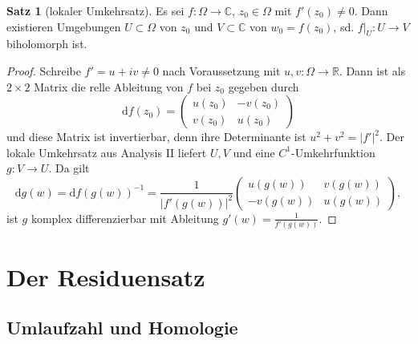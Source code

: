 \documentclass[11pt,titlepage]{article}
\theoremstyle{definition}
\newtheorem{theorem}{Satz}[section]
\theoremstyle{remark}
\begin{document}
	\begin{theorem}[lokaler Umkehrsatz]
		Es sei $f:\Omega\to\mathbb{C}$, $z_0\in\Omega$ mit $f'(z_0)\neq 0$. Dann existieren 
		Umgebungen $U\subset\Omega$ von $z_0$ und $V\subset\mathbb{C}$ von $w_0=f(z_0)$, 
		sd. $f|_U :U\to V$ biholomorph ist.
	\end{theorem}
	
	\begin{proof}
		Schreibe $f'=u+iv \neq 0$ nach Voraussetzung mit $u,v:\Omega\to\mathbb{R}$. Dann ist 
		als $2\times 2$ Matrix die relle Ableitung von $f$ bei $z_0$ gegeben durch 
		\[ \mathrm{d}f(z_0) =\begin{pmatrix} u(z_0)&-v(z_0)\\v(z_0)&u(z_0)\end{pmatrix} \]
		und diese Matrix ist invertierbar, denn ihre Determinante ist $u^2 +v^2 =|f'|^2$. 
		Der lokale Umkehrsatz aus Analysis II liefert $U,V$ und eine $C^1$-Umkehrfunktion 
		$g:V\to U$. Da gilt
		\[ \mathrm{d}g(w) =\mathrm{d} f(g(w))^{-1} =\frac{1}{|f'(g(w))|^2} 
		\begin{pmatrix} u(g(w))&v(g(w))\\-v(g(w))&u(g(w))\end{pmatrix}, \]
		ist $g$ komplex differenzierbar mit Ableitung $g'(w)=\frac{1}{f'(g(w))}$.
	\end{proof}
	
	\section{Der Residuensatz}
	
	\subsection{Umlaufzahl und Homologie}
	
\end{document}
